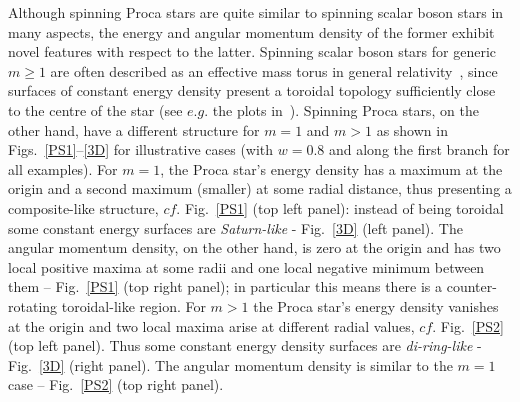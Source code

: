 Although spinning Proca stars are quite similar to spinning scalar boson stars in many aspects, the energy and angular momentum density of the former exhibit novel features with respect to the latter.
Spinning scalar boson stars for generic $m\geqslant 1$ are often described as an effective mass torus in general relativity~\cite{Schunck:1996he}, since surfaces of constant energy density present a toroidal topology sufficiently close to the centre of the star (see $e.g.$ the plots in~\cite{Herdeiro:2014ima}).
Spinning Proca stars, on the other hand, have a different structure for $m=1$ and $m>1$ as shown in Figs.~\ref{PS1}--\ref{3D} for illustrative cases (with $w=0.8$ and along the first branch for all examples).
For $m=1$, the Proca star's energy density has a maximum at the origin and a second maximum (smaller) at some radial distance, thus presenting a composite-like structure, $cf.$ Fig.~\ref{PS1} (top left panel): instead of being toroidal some constant energy surfaces are \textit{Saturn-like} - Fig.~\ref{3D} (left panel).
The angular momentum density, on the other hand, is zero at the origin and has two local positive maxima at some radii and one local negative minimum between them -- Fig.~\ref{PS1} (top right panel); in particular this means there is a counter-rotating toroidal-like region.
For $m>1$ the Proca star's energy density vanishes at the origin and two local maxima arise at different radial values, $cf.$ Fig.~\ref{PS2} (top left panel).
Thus some constant energy density surfaces are \textit{di-ring-like} - Fig.~\ref{3D} (right panel).
The angular momentum density is similar to the $m=1$ case -- Fig.~\ref{PS2} (top right panel).


